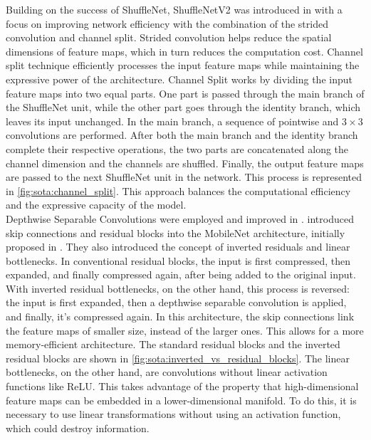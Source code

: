 Building on the success of ShuffleNet, ShuffleNetV2 was introduced in
\cite{MaShuffleNetV2} with a focus on improving network efficiency with the
combination of the strided convolution and channel split. Strided convolution
helps reduce the spatial dimensions of feature maps, which in turn reduces the
computation cost. Channel split technique efficiently processes the input
feature maps while maintaining the expressive power of the architecture. Channel
Split works by dividing the input feature maps into two equal parts. One part is
passed through the main branch of the ShuffleNet unit, while the other part goes
through the identity branch, which leaves its input unchanged. In the main
branch, a sequence of pointwise and $3\times 3$ convolutions are performed.
After both the main branch and the identity branch complete their respective
operations, the two parts are concatenated along the channel dimension and the
channels are shuffled. Finally, the output feature maps are passed to the next
ShuffleNet unit in the network. This process is represented in
\cref{fig:sota:channel_split}. This approach balances the computational
efficiency and the expressive capacity of the model.\\


Depthwise Separable Convolutions were employed and improved in
\cite{howard2017mobilenets}. \citeauthor{DongMobileNetV2} introduced skip
connections and residual blocks into the MobileNet architecture, initially
proposed in \cite{DBLP:conf/cvpr/HeZRS16}. They also introduced the concept of
inverted residuals and linear bottlenecks. In conventional residual blocks, the
input is first compressed, then expanded, and finally compressed again, after
being added to the original input. With inverted residual bottlenecks, on the
other hand, this process is reversed: the input is first expanded, then a
depthwise separable convolution is applied, and finally, it's compressed again.
In this architecture, the skip connections link the feature maps of smaller
size, instead of the larger ones. This allows for a more memory-efficient
architecture. The standard residual blocks and the inverted residual blocks are
shown in \cref{fig:sota:inverted_vs_residual_blocks}. The linear bottlenecks, on
the other hand, are convolutions without linear activation functions like ReLU.
This takes advantage of the property that high-dimensional feature maps can be
embedded in a lower-dimensional manifold. To do this, it is necessary to use
linear transformations without using an activation function, which could destroy
information.\\

